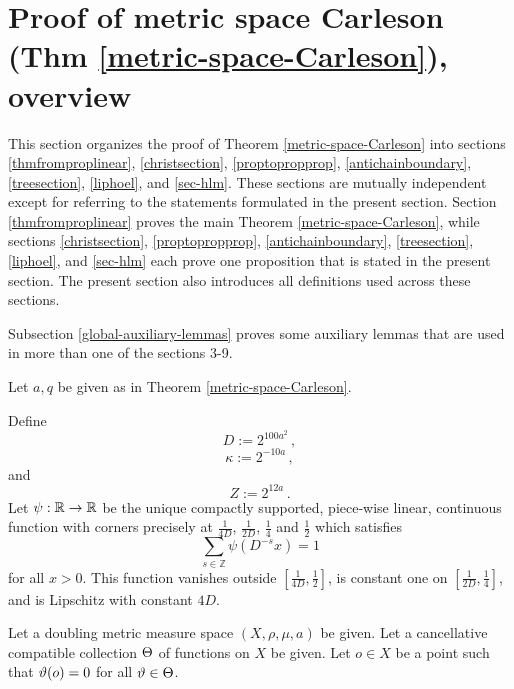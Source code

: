 \chapter{Proof of metric space Carleson (Thm \ref{metric-space-Carleson}), overview}
\label{overviewsection}


This section organizes the proof of Theorem \ref{metric-space-Carleson} into sections \ref{thmfromproplinear}, \ref{christsection}, \ref{proptopropprop}, \ref{antichainboundary}, \ref{treesection}, \ref{liphoel}, and \ref{sec-hlm}. These sections are mutually independent except for referring to the statements formulated in the present section. Section \ref{thmfromproplinear} proves the main Theorem \ref{metric-space-Carleson}, while sections \ref{christsection}, \ref{proptopropprop}, \ref{antichainboundary}, \ref{treesection}, \ref{liphoel}, and \ref{sec-hlm} each prove one proposition that is stated in the present section. The present section also introduces all definitions used across these sections.

Subsection \ref{global-auxiliary-lemmas} proves some auxiliary lemmas that are used in more than one of the sections 3-9.

Let $a, q$ be given as in Theorem \ref{metric-space-Carleson}.




Define
\begin{equation}\label{defineD}
D:= 2^{100 a^2}\,  ,
\end{equation}
\begin{equation}\label{definekappa}
\kappa:= 2^{-10a}\,,
\end{equation}
and
\begin{equation}
    \label{defineZ}
    Z := 2^{12a}\,.
\end{equation}
Let
 $\psi:{\mathbb{R}} \to {\mathbb{R}}$ be the unique compactly supported, piece-wise linear, continuous function with corners precisely at $\frac 1{4D}$, $\frac 1{2D}$, $\frac 14$ and $\frac 12$ which satisfies
 \begin{equation}
    \label{eq-psisum}
    \sum_{s\in \mathbb{Z}} \psi(D^{-s}x)=1
\end{equation}
for all  $x>0$. This function vanishes outside $[\frac1{4D},\frac 12]$, is constant one on
$[\frac1{2D},\frac 14]$, and is Lipschitz
with constant $4D$.







Let a doubling metric measure space $(X,\rho,\mu, a)$ be given.
Let a cancellative compatible collection ${\Theta}$ of functions on $X$ be given.
Let $o\in X$ be a point such that ${\vartheta}(o)=0$
for all ${\vartheta}\in {\Theta}$.

